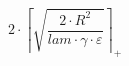 \[2 \cdot \left\lceil \sqrt{\frac{2 \cdot R^{2}}{lam \cdot \gamma \cdot \varepsilon}} \right\rceil_{+}\]
